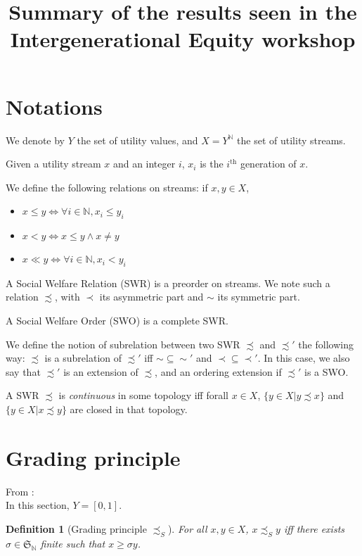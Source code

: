 \documentclass{article}
\title{Summary of the results seen in the Intergenerational Equity workshop}
\author{}
\date{}
\newtheorem{definition}{Definition}
\begin{document}
\maketitle

\section{Notations}

We denote by $Y$ the set of utility values, and $X=Y^{\mathbb{N}}$ the set of
utility streams.\par
Given a utility stream $x$ and an integer $i$, $x_i$ is the $i^\text{th}$
generation of $x$.\par
We define the following relations on streams: if $x,y\in X$,
\begin{itemize}
    \item $x \leq y \Leftrightarrow \forall i \in \mathbb{N},
        x_i\leq y_i$
    \item $x < y \Leftrightarrow x \leq y \land x \neq y$
    \item $x \ll y \Leftrightarrow \forall i \in \mathbb{N},
        x_i < y_i$
\end{itemize}\par
A Social Welfare Relation (SWR) is a preorder on streams. We note such a relation
$\precsim$, with $\prec$ its asymmetric part and $\sim$ its symmetric part.\par
A Social Welfare Order (SWO) is a complete SWR.\par
We define the notion of subrelation between two SWR $\precsim$ and $\precsim'$
the following way: $\precsim$ is a subrelation of $\precsim'$ iff 
$\sim\subseteq\sim'$ and $\prec\subseteq\prec'$. In this case, we also say that
$\precsim'$ is an extension of $\precsim$, and an ordering extension if
$\precsim'$ is a SWO.\par
A SWR $\precsim$ is \emph{continuous} in some topology iff forall $x\in X$,
$\{y\in X|y\precsim x\}$ and $\{y\in X|x\precsim y\}$ are closed in that
topology.


\section{Grading principle}

From \cite{svensson80}:\bigskip\\
In this section, $Y=[0,1]$.
\begin{definition}[Grading principle $\precsim_S$]
    For all $x,y\in X$, $x \precsim_S y$ iff there exists
    $\sigma\in\mathfrak{S}_{\mathbb{N}}$ finite
    such that $x\geq\sigma y$.
\end{definition}
\end{document}

